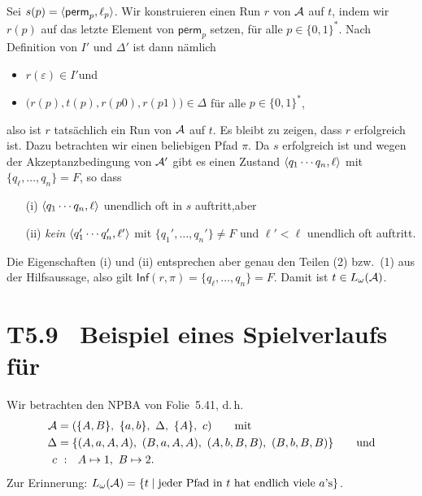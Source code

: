 \documentclass[fontsize=11pt, twoside=false, numbers=autoenddot]{scrbook}
\begin{document}
\begin{description}
    Sei $s(p) = \langle \textsf{perm}_p,\ell_p\rangle$.
    Wir konstruieren einen Run $r$ von $\mathcal{A}$ auf $t$, indem
    wir $r(p)$ auf das letzte Element von $\textsf{perm}_p$ setzen,
    für alle $p \in \{0,1\}^*$.
    Nach Definition von $I'$ und $\Delta'$ ist dann nämlich
    \begin{itemize}
      \item
        $r(\varepsilon) \in I'$\quad und
      \item
        $\Big(r(p),t(p),r(p0),r(p1)\Big) \in \Delta$ für alle $p \in \{0,1\}^*$,
    \end{itemize}
    also ist $r$ tatsächlich ein Run von $\mathcal{A}$ auf $t$.
%    
    Es bleibt zu zeigen,
    dass $r$ erfolgreich ist.
    Dazu betrachten wir einen beliebigen Pfad $\pi$.
    Da $s$ erfolgreich ist und wegen der Akzeptanzbedingung von $\mathcal{A}'$
    gibt es einen Zustand $\langle q_1\cdots q_n,\ell\rangle$ mit $\{q_\ell,\dots,q_n\} = F$,
    so dass
    \begin{enumerate}
      \item[(i)]
        $\langle q_1\cdots q_n,\ell\rangle$ unendlich oft in $s$ auftritt,\quad aber
      \item[(ii)]
        \emph{kein} $\langle q_1'\cdots q_n',\ell'\rangle$ mit $\{q_1',\dots,q_n'\} \neq F$ und $\ell' < \ell$ unendlich oft auftritt.
    \end{enumerate}
    Die Eigenschaften (i) und (ii) entsprechen aber genau den Teilen
    (2) bzw.\ (1) aus der Hilfsaussage,
    also gilt $\textsf{Inf}(r,\pi) = \{q_\ell,\dots,q_n\}=F$.
    Damit ist $t \in L_\omega(\mathcal{A})$.
    \qedhere
\end{description}

\section*{{\boldmath T5.9~ Beispiel eines Spielverlaufs für }}

Wir betrachten den NPBA von Folie~5.41,
d.\,h.\
%
\begin{align*}
  \mathcal{A}   & = (\{A,B\},~\{a,b\},~\Delta,~\{A\},~c) \qquad \text{mit} \\
  \Delta & = \{(A,a,A,A),~(B,a,A,A),~(A,b,B,B),~(B,b,B,B)\} \qquad\text{und} \\
  c      & ~:~~ A \mapsto 1,~ B \mapsto 2.
\end{align*}
%
Zur Erinnerung: $L_\omega(\mathcal{A}) = \{t \mid \text{jeder Pfad in $t$ hat endlich viele $a$'s}\}$.
\end{document}
